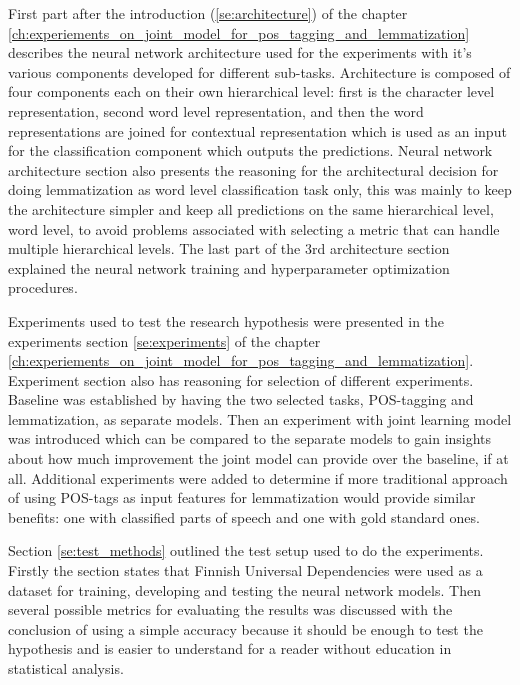 \documentclass[12pt,a4paper,english
]{tutthesis}
\begin{document}
First part after the introduction (\ref{se:architecture}) of the chapter \ref{ch:experiements_on_joint_model_for_pos_tagging_and_lemmatization} describes the neural network architecture used for the experiments with it's various components developed for different sub-tasks. Architecture is composed of four components each on their own hierarchical level: first is the character level representation, second word level representation, and then the word representations are joined for contextual representation which is used as an input for the classification component which outputs the predictions. Neural network architecture section also presents the reasoning for the architectural decision for doing lemmatization as word level classification task only, this was mainly to keep the architecture simpler and keep all predictions on the same hierarchical level, word level, to avoid problems associated with selecting a metric that can handle multiple hierarchical levels. The last part of the 3rd architecture section explained the neural network training and hyperparameter optimization procedures.

Experiments used to test the research hypothesis were presented in the experiments section \ref{se:experiments} of the chapter \ref{ch:experiements_on_joint_model_for_pos_tagging_and_lemmatization}. Experiment section also has reasoning for selection of different experiments. Baseline was established by having the two selected tasks, POS-tagging and lemmatization, as separate models. Then an experiment with joint learning model was introduced which can be compared to the separate models to gain insights about how much improvement the joint model can provide over the baseline, if at all. Additional experiments were added to determine if more traditional approach of using POS-tags as input features for lemmatization would provide similar benefits: one with classified parts of speech and one with gold standard ones.

Section \ref{se:test_methods} outlined the test setup used to do the experiments. Firstly the section states that Finnish Universal Dependencies were used as a dataset for training, developing and testing the neural network models. Then several possible metrics for evaluating the results was discussed with the conclusion of using a simple accuracy because it should be enough to test the hypothesis and is easier to understand for a reader without education in statistical analysis.
\end{document}

